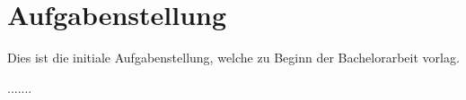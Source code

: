 \section{Aufgabenstellung}
Dies ist die initiale Aufgabenstellung, welche zu Beginn der Bachelorarbeit vorlag. 

.......

